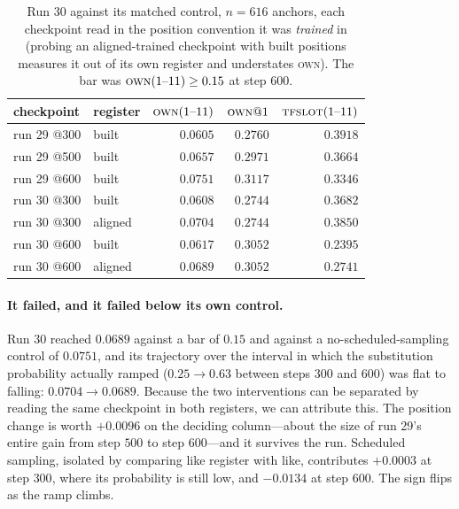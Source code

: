 \documentclass{article} %
\begin{document}
\begin{table}[t]
\centering
\caption{Run 30 against its matched control, $n=616$ anchors, each checkpoint read in the position
convention it was \emph{trained} in (probing an aligned-trained checkpoint with built positions
measures it out of its own register and understates \textsc{own}). The bar was
$\textsc{own}(1\text{--}11) \ge 0.15$ at step $600$.}
\label{tab:run30}
\begin{tabular}{llrrr}
\toprule
checkpoint & register & $\textsc{own}(1\text{--}11)$ & $\textsc{own}@1$ & $\textsc{tfslot}(1\text{--}11)$ \\
\midrule
run 29 @300 & built   & $0.0605$ & $0.2760$ & $0.3918$ \\
run 29 @500 & built   & $0.0657$ & $0.2971$ & $0.3664$ \\
run 29 @600 & built   & $0.0751$ & $0.3117$ & $0.3346$ \\
\addlinespace
run 30 @300 & built   & $0.0608$ & $0.2744$ & $0.3682$ \\
run 30 @300 & aligned & $0.0704$ & $0.2744$ & $0.3850$ \\
run 30 @600 & built   & $0.0617$ & $0.3052$ & $0.2395$ \\
run 30 @600 & aligned & $\mathbf{0.0689}$ & $0.3052$ & $\mathbf{0.2741}$ \\
\bottomrule
\end{tabular}
\end{table}

\paragraph{It failed, and it failed below its own control.} Run 30 reached $0.0689$ against a bar of
$0.15$ and against a no-scheduled-sampling control of $0.0751$, and its trajectory over the interval
in which the substitution probability actually ramped ($0.25 \to 0.63$ between steps $300$ and $600$)
was flat to falling: $0.0704 \to 0.0689$. Because the two interventions can be separated by reading
the same checkpoint in both registers, we can attribute this. The position change is worth
$+0.0096$ on the deciding column---about the size of run 29's entire gain from step $500$ to step
$600$---and it survives the run. Scheduled sampling, isolated by comparing like register with like,
contributes $+0.0003$ at step $300$, where its probability is still low, and $-0.0134$ at step $600$.
The sign flips as the ramp climbs.
\end{document}
